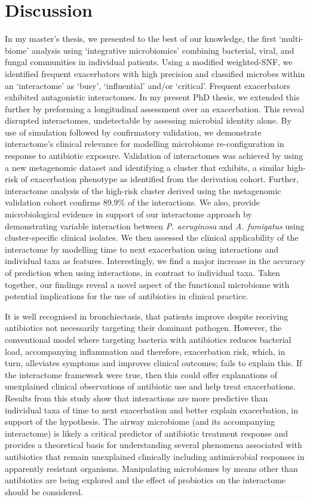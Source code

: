 \section{Discussion}
In my master’s thesis, we presented to the best of our knowledge, the first ‘multi-biome’ analysis using ‘integrative microbiomics’ combining bacterial, viral, and fungal communities in individual patients. Using a modified weighted-SNF, we identified frequent exacerbators with high precision and classified microbes within an ‘interactome’ as ‘busy’, ‘influential’ and/or ‘critical’. Frequent exacerbators exhibited antagonistic interactomes. In my present PhD thesis, we extended this further by preforming a longitudinal assessment over an exacerbation. This reveal disrupted interactomes, undetectable by assessing microbial identity alone. By use of simulation followed by confirmatory validation, we demonstrate interactome’s clinical relevance for modelling microbiome re-configuration in response to antibiotic exposure. Validation of interactomes was achieved by using a new metagenomic dataset and identifying a cluster that exhibits, a similar high-risk of exacerbation phenotype as identified from the derivation cohort. Further, interactome analysis of the high-risk cluster derived using the metagenomic validation cohort confirms 89.9\% of the interactions. We also, provide microbiological evidence in support of our interactome approach by demonstrating variable interaction between \emph{P. aeruginosa} and \emph{A. fumigatus} using cluster-specific clinical isolates. We then assessed the clinical applicability of the interactome by modelling time to next exacerbation using interactions and individual taxa as features. Interestingly, we find a major increase in the accuracy of prediction when using interactions, in contrast to individual taxa. Taken together, our findings reveal a novel aspect of the functional microbiome with potential implications for the use of antibiotics in clinical practice.

It is well recognised in bronchiectasis, that patients improve despite receiving antibiotics not necessarily targeting their dominant pathogen. However, the conventional model where targeting bacteria with antibiotics reduces bacterial load, accompanying inflammation and therefore, exacerbation risk, which, in turn, alleviates symptoms and improves clinical outcomes; fails to explain this. If the interactome framework were true, then this could offer explanations of unexplained clinical observations of antibiotic use and help treat exacerbations. Results from this study show that interactions are more predictive than individual taxa of time to next exacerbation and better explain exacerbation, in support of the hypothesis. The airway microbiome (and its accompanying interactome) is likely a critical predictor of antibiotic treatment response and provides a theoretical basis for understanding several phenomena associated with antibiotics that remain unexplained clinically including antimicrobial responses in apparently resistant organisms. Manipulating microbiomes by means other than antibiotics are being explored and the effect of probiotics on the interactome should be considered.

